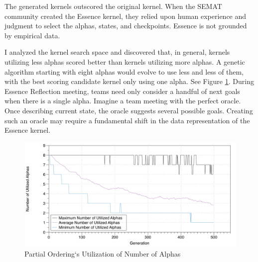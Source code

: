 \documentclass[preprint,12pt,3p]{elsarticle}
\begin{document}

The generated kernels outscored the original kernel. When the SEMAT community created the Essence kernel, they relied upon human experience and judgment to select the alphas, states, and checkpoints. Essence is not grounded by empirical data. 

I analyzed the kernel search space and discovered that, in general, kernels utilizing less alphas scored better than kernels utilizing more alphas. A genetic algorithm starting with eight alphas would evolve to use less and less of them, with the best scoring candidate kernel only using one alpha. See Figure \ref{NumberOfAlphasPartialOrdering}. During Essence Reflection meeting, teams need only consider a handful of next goals when there is a single alpha. Imagine a team meeting with the perfect oracle. Once describing current state, the oracle suggests several possible goals. Creating such an oracle may require a fundamental shift in the data representation of the Essence kernel. 

\begin{figure}[ht]\vspace*{4pt}
\centerline{\includegraphics[width=5.00in]{genetic_programming/number_of_alphas_partial_ordering_500gens_40runs_8alpha}}
\caption{Partial Ordering`s Utilization of Number of Alphas}\vspace*{-6pt}
\label{NumberOfAlphasPartialOrdering}
\end{figure}
\end{document}
